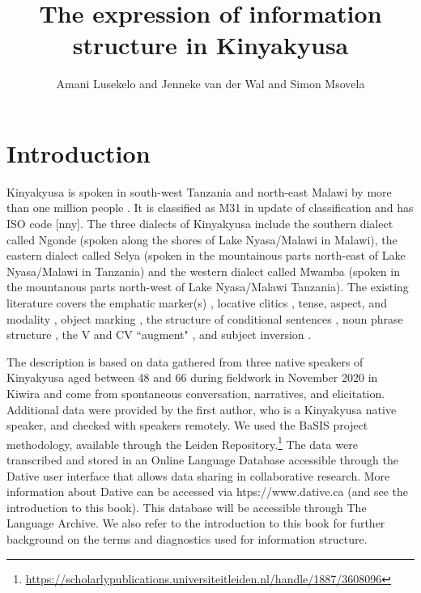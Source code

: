 \documentclass[output=paper]{langscibook}
\author{Amani Lusekelo\orcid{}\affiliation{University of Dar es Salaam} and Jenneke van der Wal\orcid{}\affiliation{Leiden University} and Simon Msovela\orcid{}\affiliation{University of Gothenburg}}
\title{The expression of information structure in Kinyakyusa}
\begin{document}
\maketitle 
\label{ch:7}


\section{Introduction}

Kinyakyusa is spoken in south-west Tanzania and north-east Malawi by more than one million people \citep{Felberg1996,LoT2009}. It is classified as M31 in  update of  classification and has ISO code [nny]. The three dialects of Kinyakyusa include the southern dialect called Ngonde (spoken along the shores of Lake Nyasa/Malawi in Malawi), the eastern dialect called Selya (spoken in the mountainous parts north-east of Lake Nyasa/Malawi in Tanzania) and the western dialect called Mwamba (spoken in the mountanous parts north-west of Lake Nyasa/Malawi Tanzania). The existing literature covers the emphatic marker(s) \citep{MwangokaVoorhoeve1960}, locative clitics \citep{Persohn2017}, tense, aspect, and modality \citep{Persohn2020}, object marking \citep{LusekeloFut}, the structure of conditional sentences \citep{Lusekelo2016}, noun phrase structure \citep{Lusekelo2009}, the V and CV ``augment" \citep{vanderWalLusekelo2022}, and subject inversion \citep{MsovelaEtAl2023}. 

The description is based on data gathered from three native speakers of Kinyakyusa aged between 48 and 66 during fieldwork in November 2020 in Kiwira and come from spontaneous conversation, narratives, and elicitation. Additional data were provided by the first author, who is a Kinyakyusa native speaker, and checked with speakers remotely. We used the BaSIS project methodology, available through the Leiden Repository.\footnote{\url{https://scholarlypublications.universiteitleiden.nl/handle/1887/3608096}} The data were transcribed and stored in an Online Language Database accessible through the Dative user interface that allows data sharing in collaborative research. More information about Dative can be accessed via htps://www.dative.ca (and see the introduction to this book). This database will be accessible through The Language Archive. We also refer to the introduction to this book for further background on the terms and diagnostics used for information structure.
\end{document}
